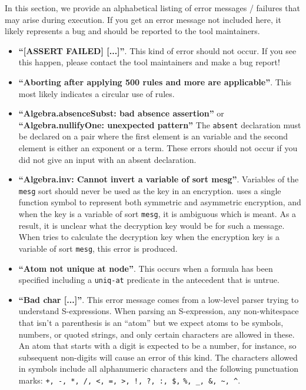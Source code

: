 In this section, we provide an alphabetical listing of error messages
/ failures that may arise during {\cpsa} execution.  If you get an error
message not included here, it likely represents a bug and should be reported
to the tool maintainers.

\begin{itemize}
\item \textbf{``[ASSERT FAILED] [...]''}.  This kind of error should
  not occur.  If you see this happen, please contact the tool maintainers
  and make a bug report!

\item \textbf{``Aborting after applying 500 rules and more are
  applicable''}.  This most likely indicates a circular use of rules.

\item \textbf{``Algebra.absenceSubst: bad absence assertion''} or
  \textbf{``Algebra.nullifyOne: unexpected pattern''} The
  \texttt{absent} declaration must be declared on a pair where the
  first element is an  variable and the second element is either
  an exponent or a  term.  These errors should not occur if you
  did not give {\cpsa} an input with an absent declaration.

\item \textbf{``Algebra.inv: Cannot invert a variable of sort mesg''}.
  Variables of the \texttt{mesg} sort should never be used as the key
  in an encryption.  {\cpsa} uses a single function symbol to represent
  both symmetric and asymmetric encryption, and when the key is a variable
  of sort \texttt{mesg}, it is ambiguous which is meant.  As a result,
  it is unclear what the decryption key would be for such a message.  When
  {\cpsa} tries to calculate the decryption key when the encryption key
  is a variable of sort \texttt{mesg}, this error is produced.

\item \textbf{``Atom not unique at node''}.  This occurs when a
  formula has been specified including a \texttt{uniq-at} predicate in
  the antecedent that is untrue.

\item \textbf{``Bad char [...]''}.  This error message comes from a
  low-level parser trying to understand S-expressions.  When parsing
  an S-expression, any non-whitespace that isn't a parenthesis is an
  ``atom'' but we expect atoms to be symbols, numbers, or quoted
  strings, and only certain characters are allowed in these.  An atom
  that starts with a digit is expected to be a number, for instance, so
  subsequent non-digits will cause an error of this kind.  The characters
  allowed in symbols include all alphanumeric characters and the following
  punctuation marks: \verb|+, -, *, /, <, =, >, !, ?, :, $,|  \verb|%, _, &, ~, ^|.


\end{itemize}
